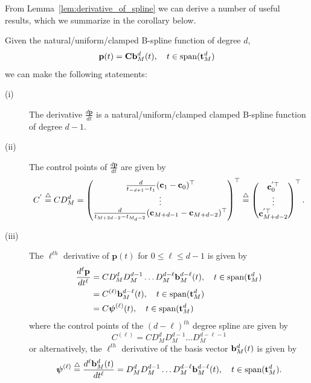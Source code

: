 %
From Lemma~\ref{lem:derivative_of_spline} we can derive a number of useful results, which we summarize in the corollary below.
\begin{corollary} \label{cor:derivatives}
	Given the natural/uniform/clamped B-spline function of degree $d$,
	\[
	\mathbf{p}(t) = \mathbf{C} \mathbf{b}_M^d(t), \quad t\in\text{span}(\mathbf{t}_M^d)
	\]
	we can make the following statements:
	\begin{description}
	\item[(i)] The derivative  $\frac{d\mathbf{p}}{dt}$ is a natural/uniform/clamped clamped B-spline function of degree $d-1$.
	\item[(ii)] The control points of $\frac{d\mathbf{p}}{dt}$ are given by
		\[
		C^{'} \stackrel{\triangle}{=} C D_M^d = \begin{pmatrix}
				\frac{d}{t_{-d+1}-t_1} (\mathbf{c}_1 - \mathbf{c}_0)^\top \\
				\vdots \\
				\frac{d}{t_{M+2d-2}-t_{M_d-2}} (\mathbf{c}_{M+d-1} - \mathbf{c}_{M+d-2})^\top
 				\end{pmatrix}^\top
 			\stackrel{\triangle}{=} \begin{pmatrix}
 			        \mathbf{c}_0^{'\top} \\
 			        \vdots \\
 			        \mathbf{c}_{M+d-2}^{'\top}
 				   \end{pmatrix}^\top.
		\]
	\item[(iii)] The $\ell^{th}$ derivative of $\mathbf{p}(t)$ for $0\leq\ell\leq d-1$ is given by
		\begin{align*}
			\frac{d^{\ell}\mathbf{p}}{dt^{\ell}} 
			&= C D_M^d D_M^{d-1} \dots D_M^{d-\ell} \mathbf{b}_M^{d-\ell}(t), \quad t\in \text{span}(\mathbf{t}_M^d) \\
			&= C^{(\ell)} \mathbf{b}_M^{d-\ell}(t), \quad t\in \text{span}(\mathbf{t}_M^d) \\
			&= C \boldsymbol{\psi}^{(\ell)}(t), \quad t\in \text{span}(\mathbf{t}_M^d) \\
		\end{align*}
		where the control points of the $(d-\ell)^{th}$ degree spline are given by
		\[
			C^{(\ell)} = C D_M^d D_M^{d-1} \dots D_M^{d-\ell-1}
		\]
		or alternatively, the $\ell^{th}$ derivative of the basis vector $\mathbf{b}_M^d(t)$ is given by
		\[
			\boldsymbol{\psi}^{(\ell)} \stackrel{\triangle}{=} \frac{d^{\ell}\mathbf{b}_M^d(t)}{dt^{\ell}} = D_M^d D_M^{d-1} \dots D_M^{d-\ell} \mathbf{b}_M^{d-\ell}(t), \quad t\in \text{span}(\mathbf{t}_M^d).
		\]
	\end{description}
\end{corollary}


